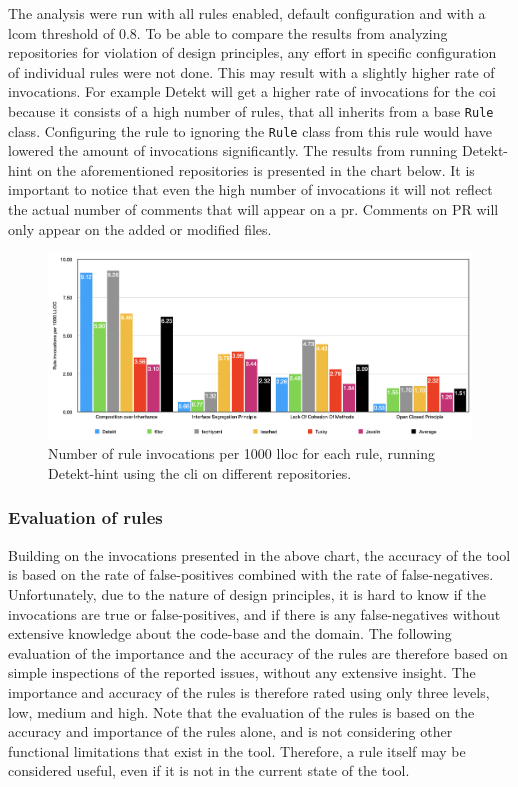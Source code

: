 \documentclass[pdftex,10pt,b5paper,twoside]{report}
\begin{document}
The analysis were run with all rules enabled, default configuration and with a \gls{lcom} threshold of 0.8. To be able to compare the results from analyzing repositories for violation of design principles, any effort in specific configuration of individual rules were not done. This may result with a slightly higher rate of invocations. For example Detekt will get a higher rate of invocations for the \gls{coi} because it consists of a high number of rules, that all inherits from a base \texttt{Rule} class. Configuring the rule to ignoring the \texttt{Rule} class from this rule would have lowered the amount of invocations significantly. The results from running Detekt-hint on the aforementioned repositories is presented in the chart below. It is important to notice that even the high number of invocations it will not reflect the actual number of comments that will appear on a \gls{pr}. Comments on PR will only appear on the added or modified files.


\begin{figure}[h!]
    \centering
    \includegraphics[width=\linewidth]{images/distribution.png}
    \caption{Number of rule invocations per 1000 \gls{lloc} for each rule, running Detekt-hint using the \gls{cli} on different repositories.}
    \label{fig:distribution}
\end{figure}


\subsubsection{Evaluation of rules}
\label{rule-evaluation}
Building on the invocations presented in the above chart, the accuracy of the tool is based on the rate of false-positives combined with the rate of false-negatives. Unfortunately, due to the nature of design principles, it is hard to know if the invocations are true or false-positives, and if there is any false-negatives without extensive knowledge about the code-base and the domain. The following evaluation of the importance and the accuracy of the rules are therefore based on simple inspections of the reported issues, without any extensive insight. The importance and accuracy of the rules is therefore rated using only three levels, low, medium and high. Note that the evaluation of the rules is based on the accuracy and importance of the rules alone, and is not considering other functional limitations that exist in the tool. Therefore, a rule itself may be considered useful, even if it is not in the current state of the tool.
\end{document}
